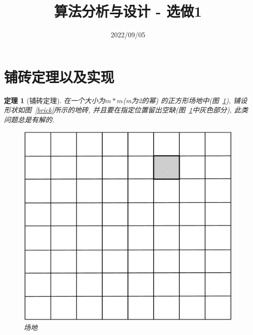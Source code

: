\documentclass[a4paper]{ctexart}
\title{算法分析与设计 - 选做1}
\author{}
\date{2022/09/05}
\begin{document}
\begin{sloppypar}  %

    \maketitle

    \section{铺砖定理以及实现}
    \vspace{1em}  %

    \newtheorem{theorem}{\bf 定理}
    \begin{theorem}[铺砖定理]
        在一个大小为$m * m$(m为2的幂)
        的正方形场地中(图~\ref{floor}),
        铺设形状如图~\ref{brick}所示的地砖,
        并且要在指定位置留出空缺(图~\ref{floor}中灰色部分),
        此类问题总是有解的.
        \begin{figure}[h]
            \centering
            \begin{minipage}[t]{0.5\linewidth}
                \centering
                \includegraphics[scale=0.4]{images/floor.png}
                \caption{场地}
                \label{floor}
            \end{minipage}
            \begin{minipage}[t]{0.3\linewidth}

\end{minipage}
\end{figure}
\end{theorem}
\end{sloppypar}
\end{document}
